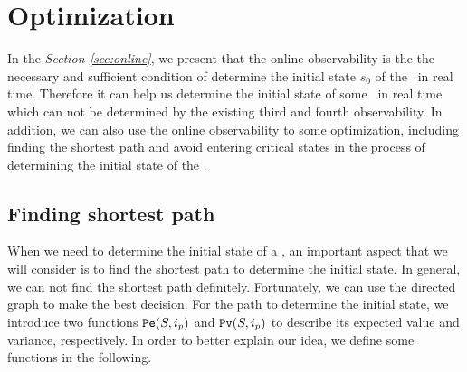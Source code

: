 \section{Optimization}
\label{sec:app}

In the {\em Section \ref{sec:online}}, we present that the online observability is the the necessary and sufficient condition of determine the initial state $s_0$ of the \BCNs\ in real time. Therefore it can help us determine the initial state of some \BCNs\ in real time which can not be determined by the existing third and fourth observability. In addition, we can also use the online observability to some optimization, including finding the shortest path and avoid entering critical states in the process of determining the initial state of the \BCNs. %


\subsection{Finding shortest path}
When we need to determine the initial state of a \BCN, an important aspect that we will consider is to find the shortest path to determine the initial state. In general, we can not find the shortest path definitely. Fortunately, we can use the directed graph to make the best decision. For the path to determine the initial state, we introduce two functions ${\tt Pe}(S, i_p)$ and ${\tt Pv}(S, i_p)$ to describe its expected value and variance, respectively. In order to better explain our idea, we define some functions in the following.



